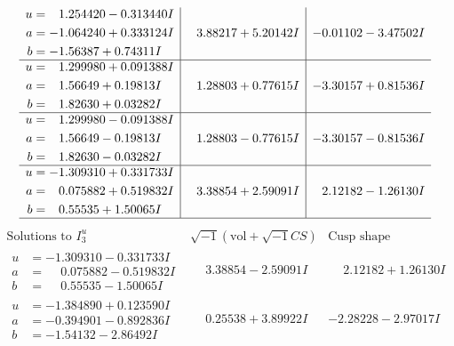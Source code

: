 \documentclass[1p]{elsarticle_modified}
\theoremstyle{definition}
\newcommand{\I}{\sqrt{-1}}
\begin{document}
$$\begin{array}{c|c|c}
\begin{aligned}
u &= \phantom{-}1.254420 - 0.313440 I \\
a &= -1.064240 + 0.333124 I \\
b &= -1.56387 + 0.74311 I\end{aligned}
 & \phantom{-}3.88217 + 5.20142 I & -0.01102 - 3.47502 I \\ \hline\begin{aligned}
u &= \phantom{-}1.299980 + 0.091388 I \\
a &= \phantom{-}1.56649 + 0.19813 I \\
b &= \phantom{-}1.82630 + 0.03282 I\end{aligned}
 & \phantom{-}1.28803 + 0.77615 I & -3.30157 + 0.81536 I \\ \hline\begin{aligned}
u &= \phantom{-}1.299980 - 0.091388 I \\
a &= \phantom{-}1.56649 - 0.19813 I \\
b &= \phantom{-}1.82630 - 0.03282 I\end{aligned}
 & \phantom{-}1.28803 - 0.77615 I & -3.30157 - 0.81536 I \\ \hline\begin{aligned}
u &= -1.309310 + 0.331733 I \\
a &= \phantom{-}0.075882 + 0.519832 I \\
b &= \phantom{-}0.55535 + 1.50065 I\end{aligned}
 & \phantom{-}3.38854 + 2.59091 I & \phantom{-}2.12182 - 1.26130 I\\
 \hline 
 \end{array}$$\newpage$$\begin{array}{c|c|c}  
\text{Solutions to }I^u_{3}& \I (\text{vol} + \sqrt{-1}CS) & \text{Cusp shape}\\
 \hline 
\begin{aligned}
u &= -1.309310 - 0.331733 I \\
a &= \phantom{-}0.075882 - 0.519832 I \\
b &= \phantom{-}0.55535 - 1.50065 I\end{aligned}
 & \phantom{-}3.38854 - 2.59091 I & \phantom{-}2.12182 + 1.26130 I \\ \hline\begin{aligned}
u &= -1.384890 + 0.123590 I \\
a &= -0.394901 - 0.892836 I \\
b &= -1.54132 - 2.86492 I\end{aligned}
 & \phantom{-}0.25538 + 3.89922 I & -2.28228 - 2.97017 I \\ \hline\begin{aligned}

\end{aligned}
\end{array}$$
\end{document}
